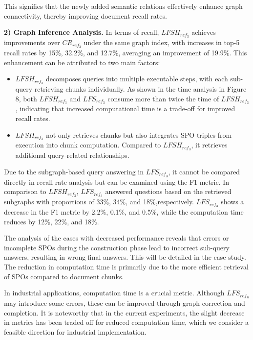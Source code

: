 \documentclass{article}
\begin{document}
This signifies that the newly added semantic relations effectively enhance graph connectivity, thereby improving document recall rates.

\textbf{2) Graph Inference Analysis.} In terms of recall, $LFSH_{ref_{3}}$ achieves improvements over $CR_{ref_{3}}$ under the same graph index, with increases in top-5 recall rates by 15\%, 32.2\%, and 12.7\%, averaging an improvement of 19.9\%. This enhancement can be attributed to two main factors:
\begin{itemize}
    \item $LFSH_{ref_{3}}$ decomposes queries into multiple executable steps, with each sub-query retrieving chunks individually. As shown in the time analysis in Figure 8, both $LFSH_{ref_{3}}$ and $LFS_{ref_{3}}$ consume more than twice the time of $LFSH_{ref_{3}}$, indicating that increased computational time is a trade-off for improved recall rates.
    \item $LFSH_{ref_{3}}$ not only retrieves chunks but also integrates SPO triples from execution into chunk computation. Compared to $LFSH_{ref_{3}}$, it retrieves additional query-related relationships.
\end{itemize}

Due to the subgraph-based query answering in $LFS_{ref_{3}}$, it cannot be compared directly in recall rate analysis but can be examined using the F1 metric. In comparison to $LFSH_{ref_{3}}$, $LFS_{ref_{3}}$ answered questions based on the retrieved subgraphs with proportions of 33\%, 34\%, and 18\%,respectively. $LFS_{ref_{3}}$ shows a decrease in the F1 metric by 2.2\%, 0.1\%, and 0.5\%, while the computation time reduces by 12\%, 22\%, and 18\%.

The analysis of the cases with decreased performance reveals that errors or incomplete SPOs during the construction phase lead to incorrect sub-query answers, resulting in wrong final answers. This will be detailed in the case study. The reduction in computation time is primarily due to the more efficient retrieval of SPOs compared to document chunks.

In industrial applications, computation time is a crucial metric. Although $LFS_{ref_{n}}$ may introduce some errors, these can be improved through graph correction and completion. It is noteworthy that in the current experiments, the slight decrease in metrics has been traded off for reduced computation time, which we consider a feasible direction for industrial implementation.
\end{document}
